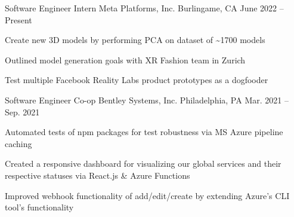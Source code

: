 

\begin{cventries}
  \cventry
  {Software Engineer Intern} %
  {Meta Platforms, Inc.} %
  {Burlingame, CA} %
  {June 2022 -- Present} %
  {
    \begin{cvitems} %
      \item {Create new 3D models by performing PCA on dataset of \textasciitilde1700 models}
      \item {Outlined model generation goals with XR Fashion team in Zurich}
      \item {Test multiple Facebook Reality Labs product prototypes as a dogfooder}
    \end{cvitems}
  }

  \cventry
  {Software Engineer Co-op} %
  {Bentley Systems, Inc.} %
  {Philadelphia, PA} %
  {Mar. 2021 -- Sep. 2021} %
  {
    \begin{cvitems} %
      \item {Automated tests of npm packages for test robustness via MS Azure pipeline caching}
      \item {Created a responsive dashboard for visualizing our global services and their respective statuses via React.js \& Azure Functions}
      \item {Improved webhook functionality of add/edit/create by extending Azure's CLI tool's functionality}
    \end{cvitems}
  }


\end{cventries}
